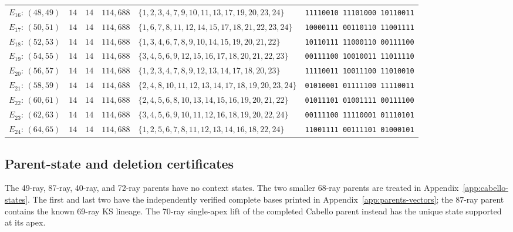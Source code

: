 \documentclass[aps,pra,reprint,superscriptaddress,longbibliography,nofootinbib,floatfix,10pt]{revtex4-2}
\theoremstyle{definition}
\begin{document}
\begin{longtable}{lrrrlc}
$E_{16}:\,(48,49)$ & $14$ & $14$ & $114{,}688$ & $\{1,2,3,4,7,9,10,11,13,17,19,20,23,24\}$ & \texttt{11110010\,11101000\,10110011} \\*
$E_{17}:\,(50,51)$ & $14$ & $14$ & $114{,}688$ & $\{1,6,7,8,11,12,14,15,17,18,21,22,23,24\}$ & \texttt{10000111\,00110110\,11001111} \\*
$E_{18}:\,(52,53)$ & $14$ & $14$ & $114{,}688$ & $\{1,3,4,6,7,8,9,10,14,15,19,20,21,22\}$ & \texttt{10110111\,11000110\,00111100} \\*
$E_{19}:\,(54,55)$ & $14$ & $14$ & $114{,}688$ & $\{3,4,5,6,9,12,15,16,17,18,20,21,22,23\}$ & \texttt{00111100\,10010011\,11011110} \\*
$E_{20}:\,(56,57)$ & $14$ & $14$ & $114{,}688$ & $\{1,2,3,4,7,8,9,12,13,14,17,18,20,23\}$ & \texttt{11110011\,10011100\,11010010} \\*
$E_{21}:\,(58,59)$ & $14$ & $14$ & $114{,}688$ & $\{2,4,8,10,11,12,13,14,17,18,19,20,23,24\}$ & \texttt{01010001\,01111100\,11110011} \\*
$E_{22}:\,(60,61)$ & $14$ & $14$ & $114{,}688$ & $\{2,4,5,6,8,10,13,14,15,16,19,20,21,22\}$ & \texttt{01011101\,01001111\,00111100} \\*
$E_{23}:\,(62,63)$ & $14$ & $14$ & $114{,}688$ & $\{3,4,5,6,9,10,11,12,16,18,19,20,22,24\}$ & \texttt{00111100\,11110001\,01110101} \\*
$E_{24}:\,(64,65)$ & $14$ & $14$ & $114{,}688$ & $\{1,2,5,6,7,8,11,12,13,14,16,18,22,24\}$ & \texttt{11001111\,00111101\,01000101}
\end{longtable}
\endgroup

\FloatBarrier
\subsection{Parent-state and deletion certificates}\label{app:parent-states}
The 49-ray, 87-ray, 40-ray, and 72-ray parents have no context states.
The two smaller 68-ray parents are treated in
Appendix~\ref{app:cabello-states}.
The first and last two have the independently verified complete bases
printed in Appendix~\ref{app:parents-vectors}; the 87-ray parent contains
the known 69-ray KS lineage. The 70-ray single-apex lift of the completed
Cabello parent instead has the unique state supported at its apex.
\end{document}
